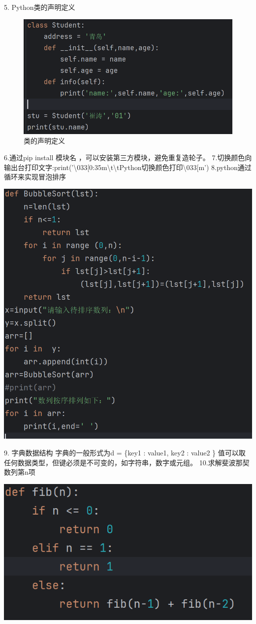 \documentclass{article}
\begin{document}
5.
Python类的声明定义

\begin{figure}
    \centering
    \includegraphics[width=0.5\linewidth]{类的声明定义.png}
    \caption{类的声明定义}
    \label{fig:enter-label}
\end{figure}

6.通过pip install 模块名 ，可以安装第三方模块，避免重复造轮子。\newline
7.切换颜色向输出台打印文字:print('\textbackslash{}033[0:35m\textbackslash{}t\textbackslash{}tPython切换颜色打印\textbackslash{}033[m') 
\newline
8.python通过循环来实现冒泡排序

\noindent
\begin{minipage}{\linewidth}
 \centering
  \includegraphics[width=0.5\linewidth]{冒泡排序.png}
  \label{fig:example}
\end{minipage}

9. 字典数据结构\newline
字典的一般形式为d = \{key1 : value1, key2 : value2 \} \newline
值可以取任何数据类型，但键必须是不可变的，如字符串，数字或元组。 
\newline
10.求解斐波那契数列第n项

\noindent
\begin{minipage}{\linewidth}
 \centering
  \includegraphics[width=0.5\linewidth]{斐波那契.png}
  \label{fig:example}
\end{minipage}
\end{document}
